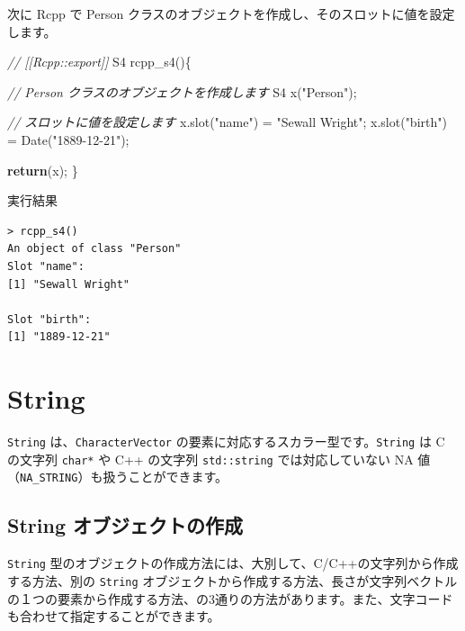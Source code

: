 \documentclass[]{book}
\newenvironment{Shaded}{\begin{snugshade}}{\end{snugshade}}
\newcommand{\CommentTok}[1]{\textcolor[rgb]{0.56,0.35,0.01}{\textit{#1}}}
\newcommand{\ControlFlowTok}[1]{\textcolor[rgb]{0.13,0.29,0.53}{\textbf{#1}}}
\newcommand{\NormalTok}[1]{#1}
\newcommand{\StringTok}[1]{\textcolor[rgb]{0.31,0.60,0.02}{#1}}
\begin{document}
次に Rcpp で Person クラスのオブジェクトを作成し、そのスロットに値を設定します。

\begin{Shaded}
\begin{Highlighting}[]
\CommentTok{// [[Rcpp::export]]}
\NormalTok{S4 rcpp_s4()\{}

    \CommentTok{// Person クラスのオブジェクトを作成します}
\NormalTok{    S4 x(}\StringTok{"Person"}\NormalTok{);}

    \CommentTok{// スロットに値を設定します}
\NormalTok{    x.slot(}\StringTok{"name"}\NormalTok{)  = }\StringTok{"Sewall Wright"}\NormalTok{;}
\NormalTok{    x.slot(}\StringTok{"birth"}\NormalTok{) = Date(}\StringTok{"1889-12-21"}\NormalTok{);}

    \ControlFlowTok{return}\NormalTok{(x);}
\NormalTok{\}}
\end{Highlighting}
\end{Shaded}

実行結果

\begin{verbatim}
> rcpp_s4()
An object of class "Person"
Slot "name":
[1] "Sewall Wright"

Slot "birth":
[1] "1889-12-21"
\end{verbatim}

\hypertarget{string}{%
\chapter{String}\label{string}}

\texttt{String} は、\texttt{CharacterVector} の要素に対応するスカラー型です。\texttt{String} は C の文字列 \texttt{char*} や C++ の文字列 \texttt{std::string} では対応していない NA 値（\texttt{NA\_STRING}）も扱うことができます。

\hypertarget{string-}{%
\section{String オブジェクトの作成}\label{string-}}

\texttt{String} 型のオブジェクトの作成方法には、大別して、C/C++の文字列から作成する方法、別の \texttt{String} オブジェクトから作成する方法、長さが文字列ベクトルの１つの要素から作成する方法、の3通りの方法があります。また、文字コードも合わせて指定することができます。
\end{document}
